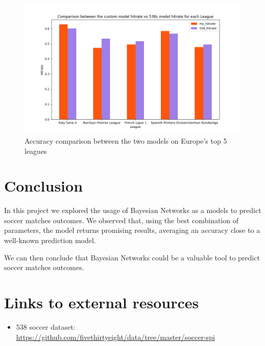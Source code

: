\documentclass[letterpaper]{article}
\begin{document}
\begin{figure}
    \centering
    \includegraphics[scale=0.35]{images/comparison.png}
    \caption{Accuracy comparison between the two models on Europe's top 5 leagues }
    \label{fig:network}
\end{figure}





\section{Conclusion}

In this project we explored the usage of Bayesian Networks as a models to predict soccer matches outcomes. We observed that, using the best combination of parameters, the model returns promising results, averaging an accuracy close to a well-known prediction model.

We can then conclude that Bayesian Networks could be a valuable tool to predict soccer matches outcomes.


\section{Links to external resources}

\begin{itemize}
    
    \item 538 soccer dataset:  \url {https://github.com/fivethirtyeight/data/tree/master/soccer-spi}
\end{itemize}


\bigskip



\end{document}
